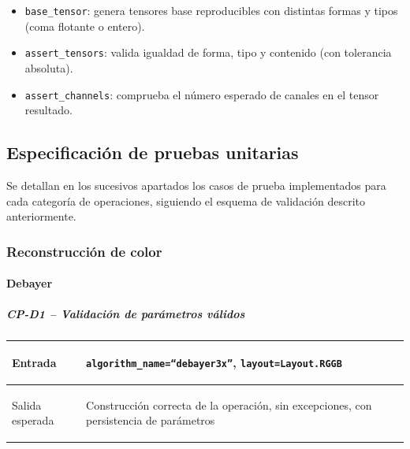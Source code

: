 \begin{itemize}[noitemsep]
	\item \texttt{base\_tensor}: genera tensores base reproducibles con distintas formas y tipos
	      (coma flotante o entero).
	\item \texttt{assert\_tensors}: valida igualdad de forma, tipo y contenido (con tolerancia absoluta).
	\item \texttt{assert\_channels}: comprueba el número esperado de canales en el tensor resultado.
\end{itemize}

\newpage

\newcommand{\testcasetable}[2]{%
	\par\vspace{0.5em}\noindent
	\renewcommand{\tabularxcolumn}[1]{m{##1}}%
	\setlength{\tabcolsep}{8pt}%
	\begin{tabularx}{\linewidth}
		{|>{\columncolor[gray]{0.92}\hsize=0.35\hsize\bfseries\raggedright\arraybackslash}X|>{\hsize=1.65\hsize\raggedright\arraybackslash}X|}
		\hline
		Entrada         & #1 \\
		\hline
		Salida esperada & #2 \\
		\hline
	\end{tabularx}%
	\par\vspace{0.5em}
}

\subsection{Especificación de pruebas unitarias} \label{subsec:8_2_especificacion_pruebas_unitarias}
Se detallan en los sucesivos apartados los casos de prueba implementados para cada categoría de operaciones, siguiendo el esquema de validación
descrito anteriormente.

\subsubsection{Reconstrucción de color} \label{subsubsec:8_2_1_bayer}
\paragraph{Debayer}

\subparagraph{CP-D1 -- Validación de parámetros válidos}\label{cp:CP-D1}
\testcasetable
{\texttt{algorithm\_name=``debayer3x''}, \texttt{layout=Layout.RGGB}}
{Construcción correcta de la operación, sin excepciones, con persistencia de parámetros}

